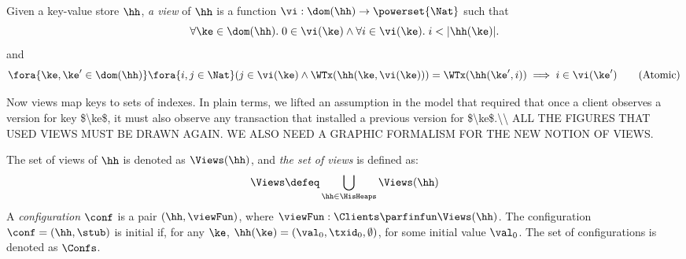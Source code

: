 \begin{definition}
\label{def:view}
\label{def:cuts}
\label{def:views}
\label{def:configuration}
Given a key-value store $\hh$, \emph{a view} of $\hh$ is a function  
$\vi: \dom(\hh) \to\powerset{\Nat}$ such that  
\[
\forall \ke \in \dom(\hh).\; 0 \in \vi(\ke) \wedge \forall i \in \vi(\ke).\; i < \lvert \hh(\ke) \rvert.
\]
and 
\begin{equation}
\label{eq:view.atomic}
\fora{ \ke,\ke' \in \dom(\hh)} \fora{ i,j \in \Nat} (j \in \vi(\ke) \wedge 
\WTx(\hh(\ke, \vi(\ke))) = \WTx(\hh(\ke', i)) \implies i \in \vi(\ke')
\tag{Atomic}
\end{equation}

\ac{Now views map keys to sets of indexes. In plain terms, we lifted 
an assumption in the model that required that once a client observes 
a version for key $\ke$, it must also observe any transaction that 
installed a previous version for $\ke$.\\
ALL THE FIGURES THAT USED VIEWS MUST BE DRAWN AGAIN. WE ALSO NEED A 
GRAPHIC FORMALISM FOR THE NEW NOTION OF VIEWS.}


The set of views of $\hh$ is denoted 
as $\Views(\hh)$, and \emph{the set of views} is defined as:
\[
\Views \defeq \bigcup_{\hh \in \HisHeaps} \Views(\hh)
\]
A \emph{configuration} $\conf$ is a pair $(\hh, \viewFun)$, where $\viewFun: 
\Clients \parfinfun \Views(\hh)$. The configuration $\conf = (\hh, \stub)$ is 
initial if, for any $\ke$, $\hh(\ke) = (\val_0, \txid_0, \emptyset)$, for some 
initial value $\val_0$. The set of configurations is denoted as 
$\Confs$.
\end{definition}
